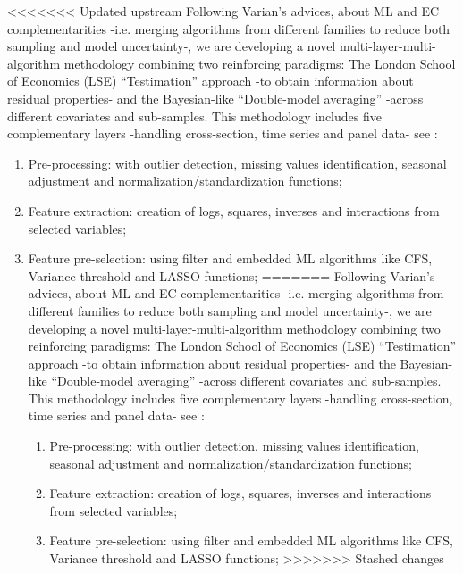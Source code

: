 \documentclass{article}
\begin{document}
<<<<<<< Updated upstream
Following Varian’s advices, about ML and EC complementarities -i.e. merging algorithms from different families to reduce both sampling and model uncertainty-, we are developing a novel multi-layer-multi-algorithm methodology combining two reinforcing paradigms: The London School of Economics (LSE) “Testimation” approach -to obtain information about residual properties- and the Bayesian-like “Double-model averaging” -across different covariates and sub-samples. This methodology includes five complementary layers -handling cross-section, time series and panel data- see \cite{gsreg2019}: \begin{enumerate}
    \item Pre-processing: with outlier detection, missing values identification, seasonal adjustment and normalization/standardization functions; 
    
    \item  Feature extraction: creation of logs, squares, inverses and interactions from selected variables;
    
    \item  Feature pre-selection: using filter and embedded ML algorithms like CFS, Variance threshold and LASSO functions; 
=======
Following Varian’s advices, about ML and EC complementarities -i.e. merging algorithms from different families to reduce both sampling and model uncertainty-, we are developing a novel multi-layer-multi-algorithm methodology combining two reinforcing paradigms: The London School of Economics (LSE) “Testimation” approach -to obtain information about residual properties- and the Bayesian-like “Double-model averaging” -across different covariates and sub-samples. This methodology includes five complementary layers -handling cross-section, time series and panel data- see \cite{gsreg2019}: 

\begin{enumerate}
    \item Pre-processing: with outlier detection, missing values identification, seasonal adjustment and normalization/standardization functions; 
    
    \item Feature extraction: creation of logs, squares, inverses and interactions from selected variables;
    
    \item Feature pre-selection: using filter and embedded ML algorithms like CFS, Variance threshold and LASSO functions; 
>>>>>>> Stashed changes
    

\end{enumerate}
\end{enumerate}
\end{document}
